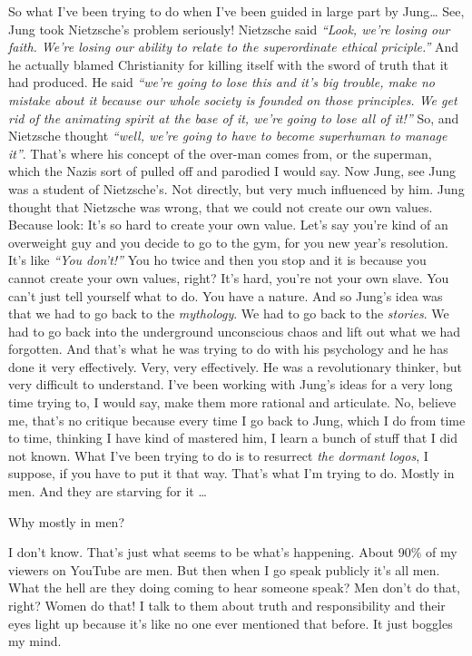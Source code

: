 \documentclass{memoir}
\newcommand{\qq}[1]{\emph{“#1”}}
\begin{document}
\begin{drama}
So what I’ve been trying to do when I’ve been guided in large part by Jung\ldots{} See, Jung took Nietzsche’s problem seriously! Nietzsche said \qq{Look, we’re losing our faith. We’re losing our ability to relate to the superordinate ethical priciple.} And he actually blamed Christianity for killing itself with the sword of truth that it had produced. He said \qq{we’re going to lose this and it’s big trouble, make no mistake about it because our whole society is founded on those principles. We get rid of the animating spirit at the base of it, we’re going to lose all of it!} So, and Nietzsche thought \qq{well, we’re going to have to become superhuman to manage it}. That’s where his concept of the over-man comes from, or the superman, which the Nazis sort of pulled off and parodied I would say. Now Jung, see Jung was a student of Nietzsche's. Not directly, but very much influenced by him. Jung thought that Nietzsche was wrong, that we could not create our own values. Because look: It’s so hard to create your own value. Let’s say you’re kind of an overweight guy and you decide to go to the gym, for you new year’s resolution. It’s like \qq{You don’t!} You ho twice and then you stop and it is because you cannot create your own values, right? It’s hard, you’re not your own slave. You can’t just tell yourself what to do. You have a nature. And so Jung’s idea was that we had to go back to the \emph{mythology}. We had to go back to the \emph{stories}. We had to go back into the underground unconscious chaos and lift out what we had forgotten. And that’s what he was trying to do with his psychology and he has done it very effectively. Very, very effectively. He was a revolutionary thinker, but very difficult to understand. I’ve been working with Jung’s ideas for a very long time trying to, I would say, make them more rational and articulate. No, believe me, that’s no critique because every time I go back to Jung, which I do from time to time, thinking I have kind of mastered him, I learn a bunch of stuff that I did not known. What I’ve been trying to do is to resurrect \emph{the dormant logos}, I suppose, if you have to put it that way. That’s what I’m trying to do. Mostly in men. And they are starving for it \ldots{}

\jrspeaks Why mostly in men?

\jpspeaks I don’t know. That’s just what seems to be what’s happening. About 90\% of my viewers on YouTube are men. But then when I go speak publicly it’s all men. What the hell are they doing coming to hear someone speak? Men don’t do that, right? Women do that! I talk to them about truth and responsibility and their eyes light up because it’s like no one ever mentioned that before. It just boggles my mind.


\end{drama}
\end{document}
